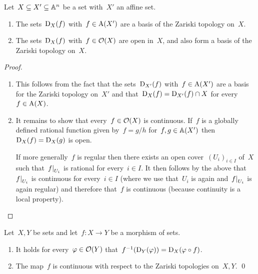 \begin{lemma}
  Let~$X \subseteq X' \subseteq \mathbb{A}^n$ be a {\qaffine} set with~$X'$ an affine set.
  \begin{enumerate}
    \item
      The sets~$\operatorname{D}_X(f)$ with~$f \in \operatorname{A}(X')$ are a basis of the Zariski topology on~$X$.
    \item
      The sets~$\operatorname{D}_X(f)$ with~$f \in \mathcal{O}(X)$ are open in~$X$, and also form a basis of the Zariski topology on~$X$.
  \end{enumerate}
\end{lemma}


\begin{proof}
  \leavevmode
  \begin{enumerate}
    \item
      This follows from the fact that the sets~$\operatorname{D}_{X'}(f)$ with~$f \in \operatorname{A}(X')$ are a basis for the Zariski topology on~$X'$ and that~$\operatorname{D}_X(f) = \operatorname{D}_{X'}(f) \cap X$ for every~$f \in \operatorname{A}(X)$.
    \item
      It remains to show that every~$f \in \mathcal{O}(X)$ is continuous.
      If~$f$ is a globally defined rational function given by~$f = g/h$ for~$f, g \in \mathbb{A}(X')$ then~$\operatorname{D}_X(f) = \operatorname{D}_X(g)$ is open.
      
      If more generally~$f$ is regular then there exists an open cover~$(U_i)_{i \in I}$ of~$X$ such that~$\restrict{f}{U_i}$ is rational for every~$i \in I$.
      It then follows by the above that~$\restrict{f}{U_i}$ is continuous for every~$i \in I$ (where we use that~$U_i$ is again {\qaffine} and~$\restrict{f}{U_i}$ is again regular) and therefore that~$f$ is continuous (because continuity is a local property).
    \qedhere
  \end{enumerate}
\end{proof}


\begin{corollary}
  Let~$X,Y$ be {\qaffine} sets and let~$f \colon X \to Y$ be a morphism of {\qaffine} sets.
\ \begin{enumerate}
    \item
      It holds for every~$\varphi \in \mathcal{O}(Y)$ that~$f^{-1}(\operatorname{D}_Y(\varphi)) = \operatorname{D}_X(\varphi \circ f)$.
    \item
      The map~$f$ is continuous with respect to the Zariski topologies on~$X,Y$.
    \qed
  \end{enumerate}
\end{corollary}


